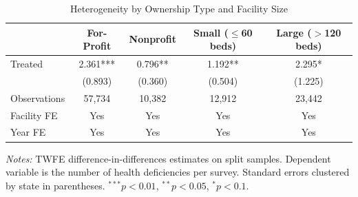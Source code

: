 \begin{table}[htbp]
\centering
\caption{Heterogeneity by Ownership Type and Facility Size}
\label{tab:heterogeneity}
\begin{tabular}{lcccc}
\hline\hline
 & For-Profit & Nonprofit & Small ($\leq$60 beds) & Large ($>$120 beds) \\
\hline
Treated & 2.361*** & 0.796** & 1.192** & 2.295* \\
 & (0.893) & (0.360) & (0.504) & (1.225) \\
\hline
Observations & 57,734 & 10,382 & 12,912 & 23,442 \\
Facility FE & Yes & Yes & Yes & Yes \\
Year FE & Yes & Yes & Yes & Yes \\
\hline\hline
\end{tabular}
\begin{tablenotes}[flushleft]
\small
\item \textit{Notes:} TWFE difference-in-differences estimates on split samples. Dependent variable is the number of health deficiencies per survey. Standard errors clustered by state in parentheses. $^{***}p<0.01$, $^{**}p<0.05$, $^{*}p<0.1$.
\end{tablenotes}
\end{table}
